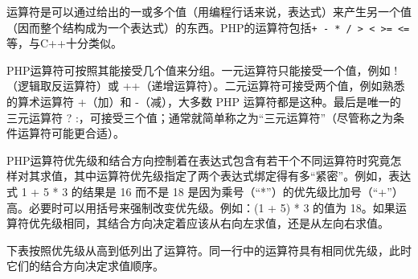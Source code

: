 运算符是可以通过给出的一或多个值（用编程行话来说，表达式）来产生另一个值（因而整个结构成为一个表达式）的东西。PHP的运算符包括\verb|+ - * / > < >= <=|等，与C++十分类似。

PHP运算符可按照其能接受几个值来分组。一元运算符只能接受一个值，例如 !（逻辑取反运算符）或 +\/+（递增运算符）。二元运算符可接受两个值，例如熟悉的算术运算符 +（加）和 -（减），大多数 PHP 运算符都是这种。最后是唯一的三元运算符 ? :，可接受三个值；通常就简单称之为“三元运算符”（尽管称之为条件运算符可能更合适）。


PHP运算符优先级和结合方向控制着在表达式包含有若干个不同运算符时究竟怎样对其求值，其中运算符优先级指定了两个表达式绑定得有多“紧密”。例如，表达式 1 + 5 * 3 的结果是 16 而不是 18 是因为乘号（“*”）的优先级比加号（“+”）高。必要时可以用括号来强制改变优先级。例如：(1 + 5) * 3 的值为 18。如果运算符优先级相同，其结合方向决定着应该从右向左求值，还是从左向右求值。


下表按照优先级从高到低列出了运算符。同一行中的运算符具有相同优先级，此时它们的结合方向决定求值顺序。

